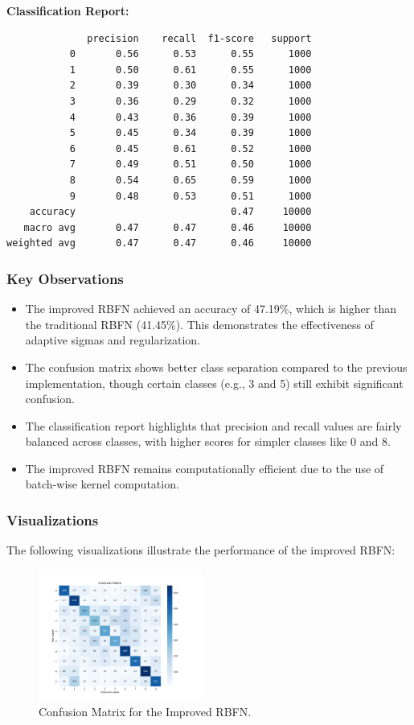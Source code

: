\documentclass[lettersize,journal]{IEEEtran}
\begin{document}
\textbf{Classification Report:}
\begin{scriptsize}
\begin{verbatim}
              precision    recall  f1-score   support
           0       0.56      0.53      0.55      1000
           1       0.50      0.61      0.55      1000
           2       0.39      0.30      0.34      1000
           3       0.36      0.29      0.32      1000
           4       0.43      0.36      0.39      1000
           5       0.45      0.34      0.39      1000
           6       0.45      0.61      0.52      1000
           7       0.49      0.51      0.50      1000
           8       0.54      0.65      0.59      1000
           9       0.48      0.53      0.51      1000
    accuracy                           0.47     10000
   macro avg       0.47      0.47      0.46     10000
weighted avg       0.47      0.47      0.46     10000
\end{verbatim}
\end{scriptsize}

\subsubsection{\textbf{Key Observations}}
\begin{itemize}
    \item The improved RBFN achieved an accuracy of 47.19\%, which is higher than the traditional RBFN (41.45\%). This demonstrates the effectiveness of adaptive sigmas and regularization.
    \item The confusion matrix shows better class separation compared to the previous implementation, though certain classes (e.g., 3 and 5) still exhibit significant confusion.
    \item The classification report highlights that precision and recall values are fairly balanced across classes, with higher scores for simpler classes like 0 and 8.
    \item The improved RBFN remains computationally efficient due to the use of batch-wise kernel computation.
\end{itemize}

\subsubsection{\textbf{Visualizations}}
The following visualizations illustrate the performance of the improved RBFN:

\begin{figure}[H]
    \centering
    \includegraphics[width=0.48\textwidth]{improved_confusion_matrix.png}
    \caption{Confusion Matrix for the Improved RBFN.}
    \label{fig:improved-confusion-matrix}
\end{figure}
\end{document}
